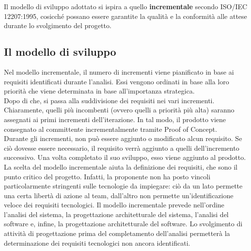 Il modello di sviluppo adottato si ispira a quello \textbf{incrementale} secondo ISO/IEC 12207:1995, cosicché possano essere garantite la qualità e la conformità alle attese durante lo svolgimento del progetto.

\subsection{Il modello di sviluppo}
Nel modello incrementale, il numero di incrementi viene pianificato in base ai requisiti identificati durante l'analisi. Essi vengono ordinati in base alla loro priorità che viene determinata in base all'importanza strategica.\\
Dopo di che, si passa alla suddivisione dei requisiti nei vari incrementi. Chiaramente, quelli più incombenti (ovvero quelli a priorità più alta) saranno assegnati ai primi incrementi dell'iterazione. In tal modo, il prodotto viene consegnato al committente incrementalmente tramite Proof of Concept.\\
Durante gli incrementi, non può essere aggiunto o modificato alcun requisito. Se ciò dovesse essere necessario, il requisito verrà aggiunto a quelli dell'incremento successivo. Una volta completato il suo sviluppo, esso viene aggiunto al prodotto.\\
La scelta del modello incrementale aiuta la definizione dei requisiti, che sono il punto critico del progetto. Infatti, la proponente non ha posto vincoli particolarmente stringenti sulle tecnologie da impiegare: ciò da un lato permette una certa libertà di azione al team, dall'altro non permette un'identificazione veloce dei requisiti tecnologici. Il modello incrementale prevede nell'ordine l'analisi del sistema, la progettazione architetturale del sistema, l'analisi del software e, infine, la progettazione architetturale del software. Lo svolgimento di attività di progettazione prima del completamento dell'analisi permetterà la determinazione dei requisiti tecnologici non ancora identificati.

